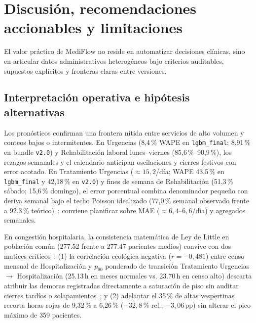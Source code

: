 
\section{Discusión, recomendaciones accionables y limitaciones}

El valor práctico de MediFlow no reside en automatizar decisiones clínicas, sino en articular datos administrativos heterogéneos bajo criterios auditables, supuestos explícitos y fronteras claras entre versiones.

\subsection{Interpretación operativa e hipótesis alternativas}

Los pronósticos confirman una frontera nítida entre servicios de alto volumen y conteos bajos o intermitentes. En Urgencias (8,4\,\% WAPE en \texttt{lgbm\_final}; 8,91\,\% en bundle \texttt{v2.0}) y Rehabilitación laboral lunes--viernes (85,6\,\%--90,9\,\%), los rezagos semanales y el calendario anticipan oscilaciones y cierres festivos con error acotado. En Tratamiento Urgencias ($\approx 15{,}2$/día; WAPE 43,5\,\% en \texttt{lgbm\_final} y 42,18\,\% en \texttt{v2.0}) y fines de semana de Rehabilitación (51,3\,\% sábado; 15,6\,\% domingo), el error porcentual combina denominador pequeño con deriva semanal bajo el techo Poisson idealizado (77,0\,\% semanal observado frente a 92,3\,\% teórico)~\cite{mediflow2026demanda}; conviene planificar sobre MAE ($\approx 6{,}4$--$6{,}6$/día) y agregados semanales.

En congestión hospitalaria, la consistencia matemática de Ley de Little en población común (\num{277,52} frente a \num{277,47} pacientes medios) convive con dos matices críticos~\cite{mediflow2026informe}: (1) la correlación ecológica negativa ($r = -0{,}481$) entre censo mensual de Hospitalización y $p_{90}$ ponderado de transición Tratamiento Urgencias $\rightarrow$ Hospitalización (\num{25,13}\,h en meses normales vs. \num{23,70}\,h en censo alto) descarta atribuir las demoras registradas directamente a saturación de piso sin auditar cierres tardíos o solapamientos~\cite{mediflow2026optimizacion}; y (2) adelantar el 35\,\% de altas vespertinas recorta horas rojas de 9,32\,\% a 6,26\,\% ($-32{,}8\,\%$ rel.; $-3{,}06$\,pp) sin alterar el pico máximo de 359 pacientes.

